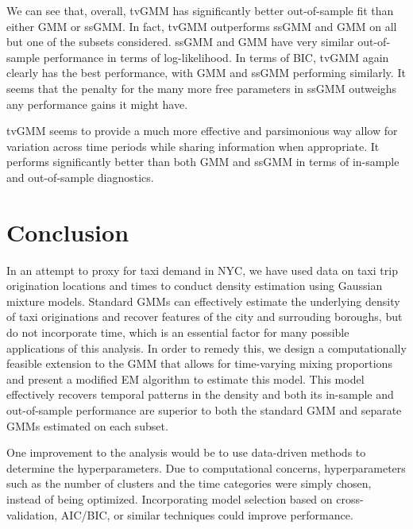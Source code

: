 \documentclass[12pt]{article}
\theoremstyle{definition}
\theoremstyle{algodesc}
\begin{document}
We can see that, overall, tvGMM has significantly better out-of-sample fit than either GMM or ssGMM. In fact, tvGMM outperforms ssGMM and GMM on all but one of the subsets considered. ssGMM and GMM have very similar out-of-sample performance in terms of log-likelihood. In terms of BIC, tvGMM again clearly has the best performance, with GMM and ssGMM performing similarly. It seems that the penalty for the many more free parameters in ssGMM outweighs any performance gains it might have.

tvGMM seems to provide a much more effective and parsimonious way allow for variation across time periods while sharing information when appropriate. It performs significantly better than both GMM and ssGMM in terms of in-sample and out-of-sample diagnostics.


\section{Conclusion}
In an attempt to proxy for taxi demand in NYC, we have used data on taxi trip origination locations and times to conduct density estimation using Gaussian mixture models. Standard GMMs can effectively estimate the underlying density of taxi originations and recover features of the city and surrouding boroughs, but do not incorporate time, which is an essential factor for many possible applications of this analysis. In order to remedy this, we design a computationally feasible extension to the GMM that allows for time-varying mixing proportions and present a modified EM algorithm to estimate this model. This model effectively recovers temporal patterns in the density and both its in-sample and out-of-sample performance are superior to both the standard GMM and separate GMMs estimated on each subset.

One improvement to the analysis would be to use data-driven methods to determine the hyperparameters. Due to computational concerns, hyperparameters such as the number of clusters and the time categories were simply chosen, instead of being optimized. Incorporating model selection based on cross-validation, AIC/BIC, or similar techniques could improve performance.
\end{document}
